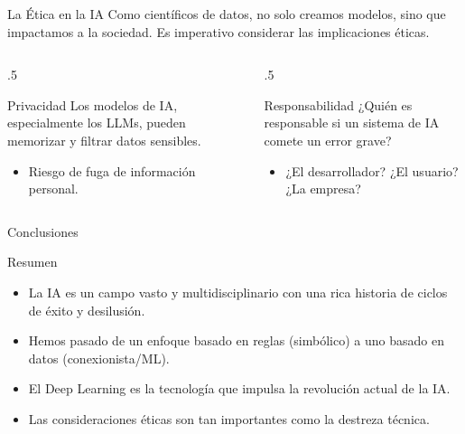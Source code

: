 \documentclass{beamer}
\begin{document}
\begin{frame}{La Ética en la IA}
	Como científicos de datos, no solo creamos modelos, sino que impactamos a la sociedad. Es imperativo considerar las implicaciones éticas.
	
	\begin{columns}[T]
		\begin{column}{.5\textwidth}
		
			\begin{exampleblock}{Privacidad}
				Los modelos de IA, especialmente los LLMs, pueden memorizar y filtrar datos sensibles.
				\begin{itemize}
					\item Riesgo de fuga de información personal.
				\end{itemize}
			\end{exampleblock}
		\end{column}
		\begin{column}{.5\textwidth}
			
			\begin{block}{Responsabilidad}
				¿Quién es responsable si un sistema de IA comete un error grave?
				\begin{itemize}
					\item ¿El desarrollador? ¿El usuario? ¿La empresa?
				\end{itemize}
			\end{block}
		\end{column}
	\end{columns}
\end{frame}


\begin{frame}{Conclusiones}
  \begin{block}{Resumen}
    \begin{itemize}
        \item La IA es un campo vasto y multidisciplinario con una rica historia de ciclos de éxito y desilusión.
        \item Hemos pasado de un enfoque basado en reglas (simbólico) a uno basado en datos (conexionista/ML).
        \item El Deep Learning es la tecnología que impulsa la revolución actual de la IA.
        \item Las consideraciones éticas son tan importantes como la destreza técnica.
    \end{itemize}
  \end{block}

  
\end{frame}
\end{document}
